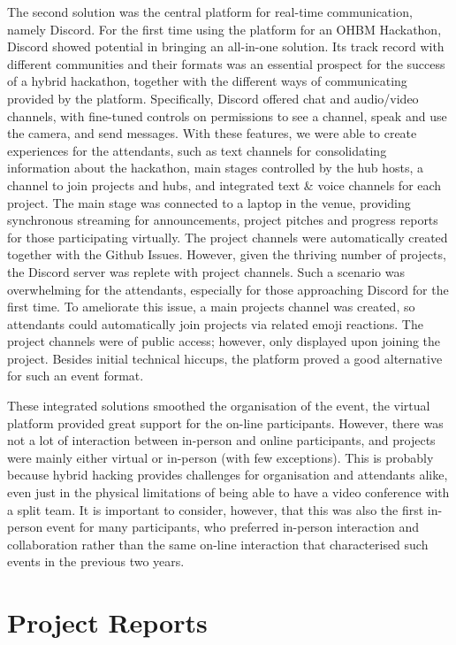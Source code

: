 \documentclass[10pt,a4paper,twocolumns]{proc}
\begin{document}
The second solution was the central platform for real-time
communication, namely Discord. For the first time using the platform for
an OHBM Hackathon, Discord showed potential in bringing an all-in-one
solution. Its track record with different communities and their formats
was an essential prospect for the success of a hybrid hackathon,
together with the different ways of communicating provided by the
platform. Specifically, Discord offered chat and audio/video channels,
with fine-tuned controls on permissions to see a channel, speak and use
the camera, and send messages. With these features, we were able to
create experiences for the attendants, such as text channels for
consolidating information about the hackathon, main stages controlled by
the hub hosts, a channel to join projects and hubs, and integrated text
\& voice channels for each project. The main stage was connected to a
laptop in the venue, providing synchronous streaming for announcements,
project pitches and progress reports for those participating virtually.
The project channels were automatically created together with the Github
Issues. However, given the thriving number of projects, the Discord
server was replete with project channels. Such a scenario was
overwhelming for the attendants, especially for those approaching
Discord for the first time. To ameliorate this issue, a main projects
channel was created, so attendants could automatically join projects via
related emoji reactions. The project channels were of public access;
however, only displayed upon joining the project. Besides initial
technical hiccups, the platform proved a good alternative for such an
event format.

These integrated solutions smoothed the organisation of the event, the
virtual platform provided great support for the on-line participants.
However, there was not a lot of interaction between in-person and online
participants, and projects were mainly either virtual or in-person (with
few exceptions). This is probably because hybrid hacking provides
challenges for organisation and attendants alike, even just in the
physical limitations of being able to have a video conference with a
split team. It is important to consider, however, that this was also the
first in-person event for many participants, who preferred in-person
interaction and collaboration rather than the same on-line interaction
that characterised such events in the previous two years.

\section{Project Reports}
\end{document}
